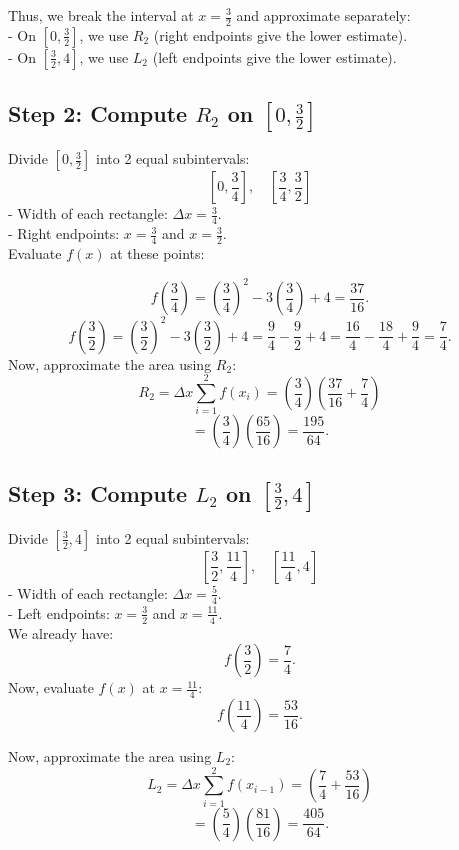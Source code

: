 \documentclass{article}
\begin{document}
Thus, we break the interval at \( x = \frac{3}{2} \) and approximate separately:\\
- On \( [0, \frac{3}{2}] \), we use \( R_2 \) (right endpoints give the lower estimate).\\
- On \( [\frac{3}{2}, 4] \), we use \( L_2 \) (left endpoints give the lower estimate).\\

\subsection*{Step 2: Compute \( R_2 \) on \( [0, \frac{3}{2}] \)}
Divide \( [0, \frac{3}{2}] \) into 2 equal subintervals:
\[
\left[0, \frac{3}{4} \right], \quad \left[ \frac{3}{4}, \frac{3}{2} \right]
\]
- Width of each rectangle: \( \Delta x = \frac{3}{4} \).\\
- Right endpoints: \( x = \frac{3}{4} \) and \( x = \frac{3}{2} \).\\


Evaluate \( f(x) \) at these points:

\[
f\left(\frac{3}{4}\right) = \left(\frac{3}{4}\right)^2 - 3\left(\frac{3}{4}\right) + 4 = \frac{37}{16}.
\]
\[
f\left(\frac{3}{2}\right) = \left(\frac{3}{2}\right)^2 - 3\left(\frac{3}{2}\right) + 4 = \frac{9}{4} - \frac{9}{2} + 4 = \frac{16}{4} - \frac{18}{4} + \frac{9}{4} = \frac{7}{4}.
\]
Now, approximate the area using \( R_2 \):
\[
R_2 = \Delta x\sum_{i=1}^2 f(x_i) = \left(\frac{3}{4}\right) \left(\frac{37}{16} +  \frac{7}{4}\right)
\]
\[
= \left(\frac{3}{4}\right)\left(\frac{65}{16}\right) = \frac{195}{64}.
\]


\subsection*{Step 3: Compute \( L_2 \) on \( [\frac{3}{2},4] \)}
Divide \( [\frac{3}{2}, 4] \) into 2 equal subintervals:
\[
\left[\frac{3}{2}, \frac{11}{4} \right], \quad \left[\frac{11}{4}, 4 \right]
\]
- Width of each rectangle: \( \Delta x = \frac{5}{4} \).\\
- Left endpoints: \( x = \frac{3}{2} \) and \( x = \frac{11}{4} \).\\

We already have:
\[
f\left(\frac{3}{2}\right) = \frac{7}{4}.
\]
Now, evaluate \( f(x) \) at \( x = \frac{11}{4} \):
\[
f\left(\frac{11}{4}\right) = \frac{53}{16}.
\]

Now, approximate the area using \( L_2 \):
\[
L_2  =\Delta x\sum_{i=1}^2 f(x_{i-1}) = \left(\frac{7}{4} +  \frac{53}{16}\right)
\]
\[
= \left(\frac{5}{4}\right)\left( \frac{81}{16}\right) = \frac{405}{64}.
\]
\end{document}
